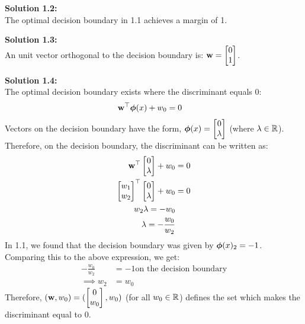 \documentclass[submit]{harvardml}
\begin{document}
\noindent\textbf{Solution 1.2:}\\
The optimal decision boundary in 1.1 achieves a margin of 1.

\noindent\textbf{Solution 1.3:}\\
An unit vector orthogonal to the decision boundary is: $\mathbf{w} = \begin{bmatrix} 0 \\ 1 \\ \end{bmatrix}$.

\noindent\textbf{Solution 1.4:}\\
The optimal decision boundary exists where the discriminant equals 0:
\begin{align*}
    \mathbf{w}^\top \boldsymbol{\phi}(x) + w_0 &= 0
\end{align*}
Vectors on the decision boundary have the form, $\boldsymbol{\phi}(x) = \begin{bmatrix} 0 \\ \lambda \\ \end{bmatrix}$ (where $\lambda \in \mathbb{R}$). Therefore, on the decision boundary, the discriminant can be written as:
\begin{align*}
    \mathbf{w}^\top \begin{bmatrix} 0\\ \lambda \\ \end{bmatrix} + w_0 &= 0\\
    \begin{bmatrix} w_1 \\ w_2 \\ \end{bmatrix}^\top \begin{bmatrix} 0\\ \lambda \\ \end{bmatrix} + w_0 &= 0\\
    w_2 \lambda = -w_0\\
    \lambda = -\frac{w_0}{w_2}
\end{align*}
In 1.1, we found that the decision boundary was given by $\boldsymbol{\phi}(x)_2 = -1$. Comparing this to the above expression, we get:
\begin{align*}
    -\frac{w_0}{w_2} &= -1 \text{on the decision boundary}\\
    \implies  w_2 &= w_0
\end{align*}
Therefore, $(\mathbf{w}, w_0) = (\begin{bmatrix} 0 \\ w_0 \\ \end{bmatrix}, w_0)$ (for all $w_0 \in \mathbb{R}$) defines the set which makes the discriminant equal to 0.
\end{document}
